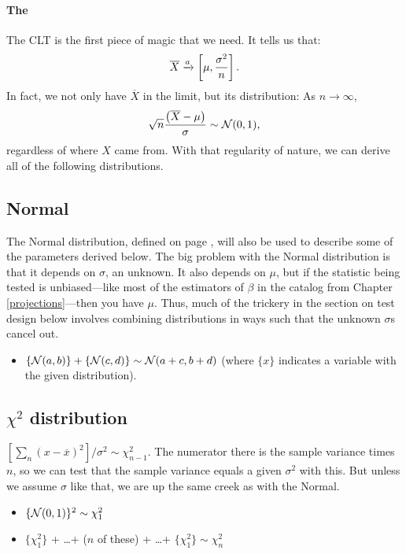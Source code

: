\paragraph{The } The CLT is the first piece of magic
that we need. It tells us that:
$$\overline X \xrightarrow{a} \left[\mu,{\sigma^2\over n}\right].$$
In fact, we not only have $\overline X$ in the limit, but its distribution:
As $n\to \infty$, $$\sqrt{n} \frac{\left(\overline X - \mu\right)}{\sigma} \sim {\cal N}(0,1),$$ 
regardless of where $X$ came from. With that regularity of nature,
we can derive all of the following distributions.  \label{CLT}

\subsection{Normal} 

The Normal distribution, defined on page \pageref{normal},
will also be used to describe some of the parameters derived below.
The big problem with the Normal distribution is that it depends on $\sigma$, an
unknown. It also depends on $\mu$, but if the statistic
being tested is unbiased---like most of the estimators of $\beta$ in the
catalog from Chapter \ref{projections}---then you have $\mu$. Thus, much of the trickery in the
section on test design below involves combining distributions in ways
such that the unknown $\sigma$s cancel out.

\begin{itemize}
\item $\{{\cal N} (a,b)\} + \{{\cal N} (c,d)\} \sim {\cal N}
(a+c,b+d)$ (where $\{x\}$ indicates a variable with the given distribution).
\end{itemize}

\subsection{$\chi^2$ distribution} $[\sum_n (x-\overline
x)^2]/\sigma^2\sim \chi^2_{n-1}$. The numerator there is the sample
variance times $n$, so we can test that the sample variance equals a
given $\sigma^2$ with this. But unless we assume $\sigma$ like that,
we are up the same creek as with the Normal.

\begin{itemize}
\item $\{{\cal N} (0,1)\}^2 \sim \chi^2_1$

\item $\{\chi^2_1\}$ + \dots + ($n$ of these) + \dots + $\{\chi^2_1\} \sim \chi^2_n$

\end{itemize}			\label{chisq}

